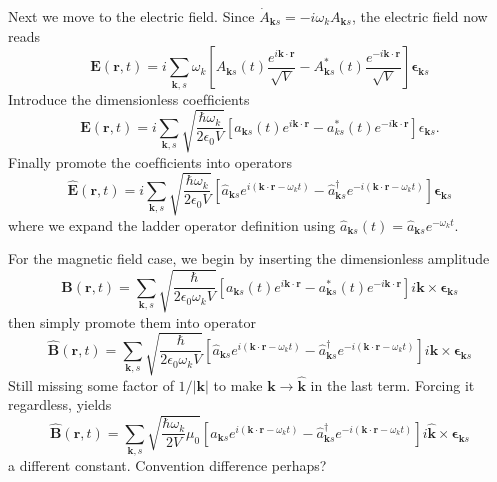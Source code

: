 \documentclass[../../../main.tex]{subfiles}
\begin{document}
Next we move to the electric field.
Since $\dot{A}_{\mathbf{k}s}=-i\omega_kA_{\mathbf{k}s}$, the electric field now reads
\begin{equation*}
  \mathbf{E}(\mathbf{r}, t) = i\sum_{\mathbf{k},s}\omega_k \left[ {A}_{\mathbf{k}s}(t)\frac{e^{i \mathbf{\mathbf{k}} \cdot \mathbf{r}}}{\sqrt{V}} - {A}_{\mathbf{k}s}^*(t)\frac{e^{-i \mathbf{\mathbf{k}} \cdot \mathbf{r}}}{\sqrt{V}} \right] \boldsymbol{\epsilon}_{\mathbf{k}s}
\end{equation*}
Introduce the dimensionless coefﬁcients
\begin{equation*}
  \mathbf{E}(\mathbf{r}, t) = i \sum_{\mathbf{k},s} \sqrt{\frac{\hbar \omega_k}{2 \epsilon_0 V}} \left[ a_{\mathbf{k } s}(t) e^{i\mathbf{k} \cdot \mathbf{r}} - a_{ks}^*(t) e^{-i\mathbf{k} \cdot \mathbf{r}} \right] \epsilon_{\mathbf{k } s}.
\end{equation*}
Finally promote the coefﬁcients into operators
\begin{equation*}
  \hat{\mathbf{E}}(\mathbf{r}, t) =  i \sum_{\mathbf{k},s} \sqrt{\frac{\hbar \omega_k}{2 \epsilon_0 V}} \left[ \hat{a}_{\mathbf{k}s} e^{i(\mathbf{k} \cdot \mathbf{r} - \omega_k t)} - \hat{a}_{\mathbf{k}s}^{\dagger} e^{-i(\mathbf{k} \cdot \mathbf{r} - \omega_k t)} \right] \boldsymbol{\epsilon}_{\mathbf{k}s}
\end{equation*}
where we expand the ladder operator definition using $\hat{a}_{\mathbf{k }s }(t)=\hat{a}_{\mathbf{k }s}e^{-\omega_kt}$.

For the magnetic field case, we begin by inserting the dimensionless amplitude
\begin{equation*}
  \mathbf{B}(\mathbf{r},t) = \sum_{\mathbf k,s}   \sqrt{\frac{\hbar}{2 \epsilon_0 \omega_k V}}
  \left[ a_{\mathbf{k } s}(t)e^{i \mathbf{k} \cdot \mathbf{r}} - a_{\mathbf{k } s}^*(t)e^{-i \mathbf{k} \cdot \mathbf{r}} \right]   i\mathbf k \times \boldsymbol{\epsilon}_{\mathbf k s}
\end{equation*}
then simply promote them into operator
\begin{equation*}
  \hat{\mathbf{B}}(\mathbf{r}, t) =  \sum_{\mathbf{k},s} \sqrt{\frac{\hbar}{2 \epsilon_0 \omega_k V}} \left[ \hat{a}_{\mathbf{k}s} e^{i(\mathbf{k} \cdot \mathbf{r} - \omega_k t)} - \hat{a}_{\mathbf{k}s}^{\dagger} e^{-i(\mathbf{k} \cdot \mathbf{r} - \omega_k t)} \right] i \mathbf{k} \times \boldsymbol{\epsilon}_{\mathbf{k}s}
\end{equation*}
Still missing some factor of $1/|\mathbf{k}|$ to make $\mathbf{k}\to \hat{\mathbf{k}}$ in the last term.
Forcing it regardless, yields
\begin{equation*}
  \hat{\mathbf{B}}(\mathbf{r}, t) =  \sum_{\mathbf{k},s} \sqrt{\frac{\hbar \omega_k}{2 V} \mu_0} \left[ \hat{a}_{\mathbf{k}s} e^{i(\mathbf{k} \cdot \mathbf{r} - \omega_k t)} - \hat{a}_{\mathbf{k}s}^{\dagger} e^{-i(\mathbf{k} \cdot \mathbf{r} - \omega_k t)} \right] i \mathbf{\hat{k}} \times \boldsymbol{\epsilon}_{\mathbf{k}s}
\end{equation*}
a different constant.
Convention difference perhaps?
\end{document}
